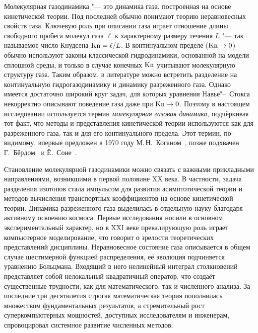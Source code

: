 Молекулярная газодинамика "--- это динамика газа, построенная на основе кинетической теории.
Под последней обычно понимают теорию неравновесных свойств газа.
Ключевую роль при описании газа играет отношение длины свободного пробега молекул газа \(\ell\)
к характерному размеру течения \(L\) "--- так называемое число Кнудсена \(\mathrm{Kn}=\ell/L\).
В континуальном пределе (\(\mathrm{Kn}\to0\)) обычно используют законы классической гидродинамики,
основанной на модели сплошной среды, и только в случае конечных \(\mathrm{Kn}\)
учитывают молекулярную структуру газа. Таким образом, в литературе можно встретить
разделение на континуальную гидрогазодинамику и динамику разреженного газа.
Однако имеется достаточно широкий круг задач, для которых уравнения Навье"--~Стокса
некорректно описывают поведение газа даже при \(\mathrm{Kn}\to0\).
Поэтому в настоящем исследовании используется термин \emph{молекулярная газовая динамика},
подчёркивая тот факт, что методы и представления кинетической теории используются
как для разреженного газа, так и для его континуального предела.
Этот термин, по-видимому, впервые предложен в 1970 году М.\,Н.~Коганом~\autocite{Kogan1971review},
позже подхвачен Г.~Бёрдом~\autocite{Bird1981} и Ё.~Соне~\autocite{Sone2007}.

{\actuality}
Становление молекулярной газодинамики можно связать с важными прикладными направлениями,
возникшими в первой половине XX века.
В частности, задача разделения изотопов стала импульсом для развития асимптотической теории
и методов вычисления транспортных коэффициентов на основе кинетической теории.
Динамика разреженного газа выделилась в отдельную науку благодаря активному освоению космоса.
Первые исследования носили в основном экспериментальный характер,
но в XXI веке превалирующую роль играет компьютерное моделирование, что
говорит о зрелости теоретических представлений дисциплины.
Неравновесное состояние газа описывается в общем случае шестимерной функцией распределения,
её эволюция подчиняется уравнению Больцмана.
Входящий в него нелинейный интеграл столкновений представляет собой нелокальный квадратичный оператор,
что создаёт существенные трудности, как для математического, так и численного анализа.
За последние три десятилетия строгая математическая теория пополнилась множеством фундаментальных результатов,
а стремительный рост суперкомпьютерных мощностей, доступных исследователям и инженерам,
спровоцировал системное развитие численных методов.

